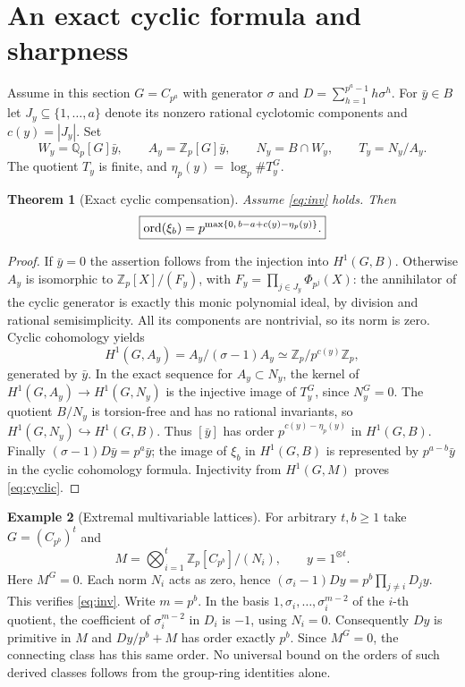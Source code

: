 \documentclass[11pt]{article}
\newtheorem{theorem}{Theorem}[section]
\theoremstyle{definition}\newtheorem{definition}[theorem]{Definition}\newtheorem{example}[theorem]{Example}
\theoremstyle{remark}\newtheorem{remark}[theorem]{Remark}
\newcommand{\Zp}{\mathbb Z_p}\newcommand{\Qp}{\mathbb Q_p}\newcommand{\Fp}{\mathbb F_p}
\begin{document}
\section{An exact cyclic formula and sharpness}
Assume in this section $G=C_{p^a}$ with generator $\sigma$ and $D=\sum_{h=1}^{p^a-1}h\sigma^h$. For $\bar y\in B$ let $J_y\subseteq\{1,\ldots,a\}$ denote its nonzero rational cyclotomic components and $c(y)=|J_y|$. Set
\[
 W_y=\Qp[G]\bar y,\qquad A_y=\Zp[G]\bar y,\qquad
 N_y=B\cap W_y,\qquad T_y=N_y/A_y.
\]
The quotient $T_y$ is finite, and $\eta_p(y)=\log_p\#T_y^G$.
\begin{theorem}[Exact cyclic compensation]\label{thm:cyclic}
Assume \eqref{eq:inv} holds. Then
\begin{equation}\label{eq:cyclic}
 \boxed{\operatorname{ord}(\xi_b)=p^{\max\{0,\,b-a+c(y)-\eta_p(y)\}}.}
\end{equation}
\end{theorem}
\begin{proof}
If $\bar y=0$ the assertion follows from the injection into $H^1(G,B)$. Otherwise $A_y$ is isomorphic to $\Zp[X]/(F_y)$, with $F_y=\prod_{j\in J_y}\Phi_{p^j}(X)$: the annihilator of the cyclic generator is exactly this monic polynomial ideal, by division and rational semisimplicity. All its components are nontrivial, so its norm is zero. Cyclic cohomology yields
\[
 H^1(G,A_y)=A_y/(\sigma-1)A_y\simeq\Zp/p^{c(y)}\Zp,
\]
 generated by $\bar y$. In the exact sequence for $A_y\subset N_y$, the kernel of $H^1(G,A_y)\to H^1(G,N_y)$ is the injective image of $T_y^G$, since $N_y^G=0$. The quotient $B/N_y$ is torsion-free and has no rational invariants, so $H^1(G,N_y)\hookrightarrow H^1(G,B)$. Thus $[\bar y]$ has order $p^{c(y)-\eta_p(y)}$ in $H^1(G,B)$. Finally $(\sigma-1)D\bar y=p^a\bar y$; the image of $\xi_b$ in $H^1(G,B)$ is represented by $p^{a-b}\bar y$ in the cyclic cohomology formula. Injectivity from $H^1(G,M)$ proves \eqref{eq:cyclic}.
\end{proof}

\begin{example}[Extremal multivariable lattices]\label{ex:sharp}
For arbitrary $t,b\ge1$ take $G=(C_{p^b})^t$ and
\[
 M=\bigotimes_{i=1}^t\Zp[C_{p^b}]/(N_i),\qquad y=1^{\otimes t}.
\]
Here $M^G=0$. Each norm $N_i$ acts as zero, hence $(\sigma_i-1)Dy=p^b\prod_{j\ne i}D_j y$. This verifies \eqref{eq:inv}. Write $m=p^b$. In the basis $1,\sigma_i,\ldots,\sigma_i^{m-2}$ of the $i$-th quotient, the coefficient of $\sigma_i^{m-2}$ in $D_i$ is $-1$, using $N_i=0$. Consequently $Dy$ is primitive in $M$ and $Dy/p^b+M$ has order exactly $p^b$. Since $M^G=0$, the connecting class has this same order. No universal bound on the orders of such derived classes follows from the group-ring identities alone.
\end{example}
\end{document}
